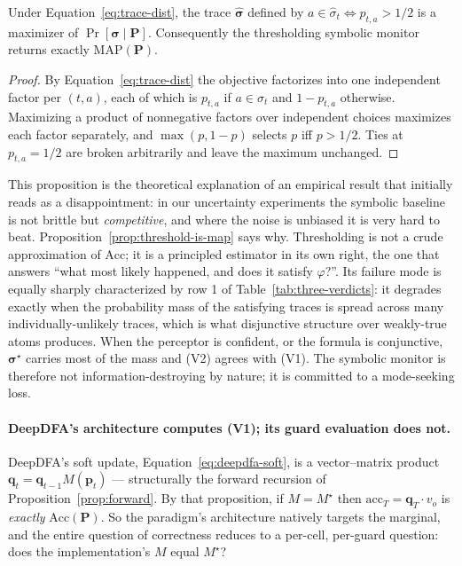 \begin{proposition}
\label{prop:threshold-is-map}
Under Equation~\eqref{eq:trace-dist}, the trace $\hat{\boldsymbol{\sigma}}$ defined by $a \in \hat\sigma_t \iff p_{t,a} > 1/2$ is a maximizer of $\Pr[\boldsymbol{\sigma} \mid \mathbf{P}]$. Consequently the thresholding symbolic monitor returns exactly $\mathrm{MAP}(\mathbf{P})$.
\end{proposition}

\begin{proof}
By Equation~\eqref{eq:trace-dist} the objective factorizes into one independent factor per $(t,a)$, each of which is $p_{t,a}$ if $a \in \sigma_t$ and $1 - p_{t,a}$ otherwise. Maximizing a product of nonnegative factors over independent choices maximizes each factor separately, and $\max(p, 1-p)$ selects $p$ iff $p > 1/2$. Ties at $p_{t,a} = 1/2$ are broken arbitrarily and leave the maximum unchanged.
\end{proof}

This proposition is the theoretical explanation of an empirical result that initially reads as a disappointment: in our uncertainty experiments the symbolic baseline is not brittle but \emph{competitive}, and where the noise is unbiased it is very hard to beat. Proposition~\ref{prop:threshold-is-map} says why. Thresholding is not a crude approximation of $\mathrm{Acc}$; it is a principled estimator in its own right, the one that answers ``what most likely happened, and does it satisfy $\varphi$?''. Its failure mode is equally sharply characterized by row 1 of Table~\ref{tab:three-verdicts}: it degrades exactly when the probability mass of the satisfying traces is spread across many individually-unlikely traces, which is what disjunctive structure over weakly-true atoms produces. When the perceptor is confident, or the formula is conjunctive, $\boldsymbol{\sigma}^\star$ carries most of the mass and (V2) agrees with (V1). The symbolic monitor is therefore not information-destroying by nature; it is committed to a mode-seeking loss.

\paragraph{DeepDFA's architecture computes (V1); its guard evaluation does not.} DeepDFA's soft update, Equation~\eqref{eq:deepdfa-soft}, is a vector--matrix product $\mathbf{q}_t = \mathbf{q}_{t-1} M(\mathbf{p}_t)$ --- structurally the forward recursion of Proposition~\ref{prop:forward}. By that proposition, if $M = M^\star$ then $\mathrm{acc}_T = \mathbf{q}_T \cdot v_o$ is \emph{exactly} $\mathrm{Acc}(\mathbf{P})$. So the paradigm's architecture natively targets the marginal, and the entire question of correctness reduces to a per-cell, per-guard question: does the implementation's $M$ equal $M^\star$?

